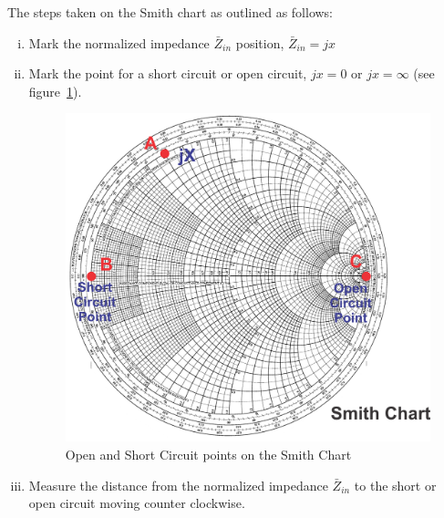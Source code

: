 The steps taken on the Smith chart as outlined as follows:
\begin{enumerate}[(i)]
\item Mark the normalized impedance $\bar{Z}_{in}$ position, $\bar{Z}_{in} = jx$
\item Mark the point for a short circuit or open circuit, $jx = 0$ or $jx = \infty$ (see figure~\ref{fig:group10diagram6}).
\begin{figure}[h]
\centering
\includegraphics[width=1\linewidth]{./graphics/group10diagram6}
\caption{Open and Short Circuit points on the Smith Chart}
\label{fig:group10diagram6}
\end{figure}

\item Measure the distance from the normalized impedance $\bar{Z}_{in}$ to the short or open circuit moving counter clockwise. 
\end{enumerate}

